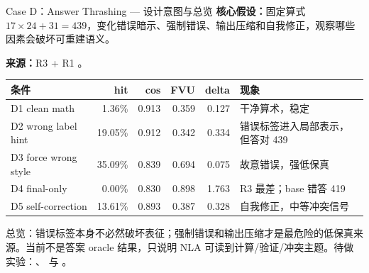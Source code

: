 
\footnotesize

\begin{frame}{Case D：Answer Thrashing — 设计意图与总览}
\scriptsize
\textbf{核心假设：}固定算式 \(17 \times 24 + 31 = 439\)，变化错误暗示、强制错误、输出压缩和自我修正，观察哪些因素会破坏可重建语义。

\textbf{来源：}R3  + R1 。

\vspace{0.25em}
\begin{tabularx}{\linewidth}{lrrrrX}
\toprule
条件 & hit & cos & FVU & delta & 现象 \\
\midrule
D1 clean math & 1.36\% & 0.913 & 0.359 & 0.127 & 干净算术，稳定 \\
D2 wrong label hint & 19.05\% & 0.912 & 0.342 & 0.334 & 错误标签进入局部表示，但答对 439 \\
D3 force wrong style & 35.09\% & 0.839 & 0.694 & 0.075 & 故意错误，强低保真 \\
D4 final-only & 0.00\% & 0.830 & 0.898 & 1.763 & R3 最差；base 错答 419 \\
D5 self-correction & 13.61\% & 0.893 & 0.387 & 0.328 & 自我修正，中等冲突信号 \\
\bottomrule
\end{tabularx}

\vspace{0.3em}
\alert{总览：}错误标签本身不必然破坏表征；强制错误和输出压缩才是最危险的低保真来源。当前不是答案 oracle 结果，只说明 NLA 可读到计算/验证/冲突主题。待做实验：、 与 。
\end{frame}

